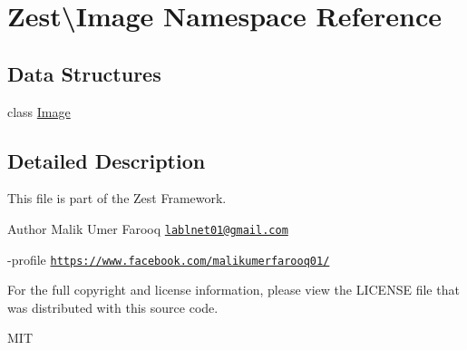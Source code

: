 \hypertarget{namespace_zest_1_1_image}{}\section{Zest\textbackslash{}Image Namespace Reference}
\label{namespace_zest_1_1_image}
\subsection*{Data Structures}
\begin{DoxyCompactItemize}
\item 
class \mbox{\hyperlink{class_zest_1_1_image_1_1_image}{Image}}
\end{DoxyCompactItemize}


\subsection{Detailed Description}
This file is part of the Zest Framework.

\begin{DoxyAuthor}{Author}
Malik Umer Farooq \href{mailto:lablnet01@gmail.com}{\tt lablnet01@gmail.\+com} 

-\/profile \href{https://www.facebook.com/malikumerfarooq01/}{\tt https\+://www.\+facebook.\+com/malikumerfarooq01/}
\end{DoxyAuthor}
For the full copyright and license information, please view the L\+I\+C\+E\+N\+SE file that was distributed with this source code.

M\+IT 